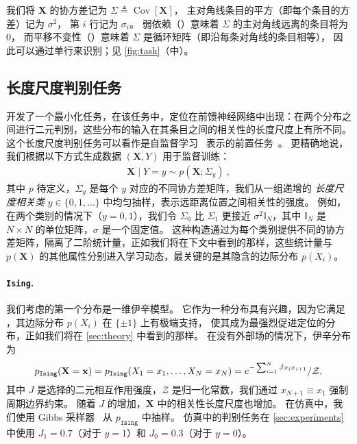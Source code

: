 我们将 $\mathbf{X}$ 的协方差记为 $\Sigma \triangleq \operatorname{Cov}[\mathbf{X}]$，
主对角线条目的平方（即每个条目的方差）记为 $\sigma^2$，
第 $i$ 行记为 $\sigma_i$。
弱依赖（）意味着 $\Sigma$ 的主对角线远离的条目将为 0，
而平移不变性（）意味着 $\Sigma$ 是循环矩阵（即沿每条对角线的条目相等），
因此可以通过单行来识别；见 \cref{fig:task}（中）。
\subsection{长度尺度判别任务}
\label{sec:task}

\textcite{ingrosso2022data} 开发了一个最小化任务，在该任务中，定位在前馈神经网络中出现：在两个分布之间进行二元判别，这些分布的输入在其条目之间的相关性的长度尺度上有所不同。
这个长度尺度判别任务可以看作是自监督学习~\parencite{kolesnikov2019revisiting,chen2020simple} 表示的前置任务~\parencite[\cf~无监督:][]{olshausen1996emergence,bell1997independent}。
更精确地说，我们根据以下方式生成数据 $(\mathbf{X},Y)$ 用于监督训练：
\begin{align} \label{eq:task}
    \mathbf{X} \mid Y = y \sim p(\mathbf{X};\Sigma_y)~,
\end{align}
其中 $p$ 待定义，$\Sigma_y$ 是每个 $y$ 对应的不同协方差矩阵，我们从一组递增的 \emph{长度尺度相关类} $y \in \{0,1,\ldots\}$ 中均匀抽样，表示远距离位置之间相关性的强度。
例如，在两个类别的情况下（$y = 0, 1$），我们令 $\Sigma_0$ 比 $\Sigma_1$ 更接近 $\sigma^2 \mathbb{I}_N$，其中 $\mathbb{I}_N$ 是 $N \times N$ 的单位矩阵，$\sigma$ 是一个固定值。
这种构造通过为每个类别提供不同的协方差矩阵，隔离了二阶统计量，正如我们将在下文中看到的那样，这些统计量与 $p(\mathbf{X})$ 的其他属性分别进入学习动态，最关键的是其隐含的边际分布 $p(X_i)$。

\paragraph{\texttt{Ising}.}\hspace{-2pt}
我们考虑的第一个分布是一维伊辛模型。
它作为一种分布具有兴趣，因为它满足 ，其边际分布 $p(X_i)$ 在 $\{ \pm 1 \}$ 上有极端支持，
使其成为最强烈促进定位的分布，正如我们将在 \cref{sec:theory} 中看到的那样。
在没有外部场的情况下，伊辛分布为
\begin{equation}
    p_\text{\texttt{Ising}}(\mathbf{X}=\mathbf{x})
    = p_\text{\texttt{Ising}}(X_1=x_1,\ldots,X_N=x_N) = e^{ -\sum_{i=1}^{N} J x_i x_{i+1} } / \mathcal{Z},
\end{equation}
其中 $J$ 是选择的二元相互作用强度，$\mathcal{Z}$ 是归一化常数，我们通过 $x_{N+1} \equiv x_1$ 强制周期边界约束。
随着 $J$ 的增加，$\mathbf{X}$ 中的相关性长度尺度也增加。
在仿真中，我们使用 Gibbs 采样器~\parencite{geman1984stochastic} 从 $p_\texttt{Ising}$ 中抽样。
仿真中的判别任务在
\cref{sec:experiments}
中使用 $J_1=0.7$（对于 $y=1$）和 $J_0=0.3$（对于 $y=0$）。

